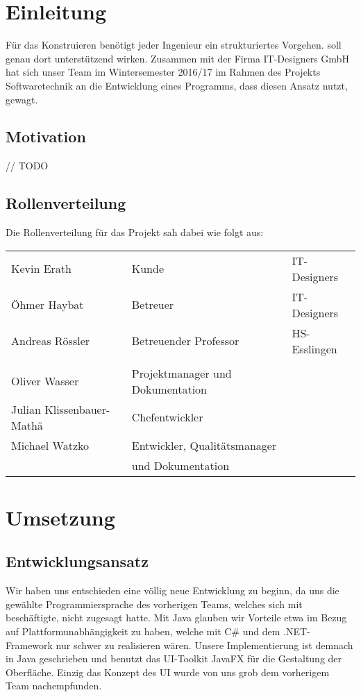 
\section{Einleitung}

Für das Konstruieren benötigt jeder Ingenieur ein strukturiertes Vorgehen. \textFlowDesign{}
soll genau dort unterstützend wirken.
Zusammen mit der Firma IT-Designers GmbH hat sich unser Team im Wintersemester 2016/17 im
Rahmen des Projekts Softwaretechnik an die Entwicklung eines Programms, dass diesen Ansatz
nutzt, gewagt.

\subsection{Motivation}
// TODO

\subsection{Rollenverteilung}
Die Rollenverteilung für das Projekt sah dabei wie folgt aus:

\begin{center}
	\begin{tabular}{l|l l}
		Kevin Erath & Kunde     & IT-Designers \\
		Öhmer Haybat & Betreuer & IT-Designers \\
		Andreas Rössler & Betreuender Professor & HS-Esslingen \\
		\\
		Oliver Wasser             & Projektmanager und Dokumentation & \\
		Julian Klissenbauer-Mathä & Chefentwickler & \\
		Michael Watzko            & Entwickler, Qualitätsmanager  \\
		                          & und Dokumentation \\
	\end{tabular}
\end{center}

\pagebreak
\section{Umsetzung}

\subsection{Entwicklungsansatz}
Wir haben uns entschieden eine völlig neue Entwicklung zu beginn, da uns die gewählte
Programmiersprache des vorherigen Teams, welches sich mit \textFlowDesign{} beschäftigte,
nicht zugesagt hatte. Mit Java glauben wir Vorteile etwa im Bezug auf 
Plattformunabhängigkeit zu haben, welche mit C\# und dem .NET-Framework nur schwer zu
realisieren wären. \newline
Unsere Implementierung ist demnach in Java geschrieben und benutzt das UI-Toolkit JavaFX
für die Gestaltung der Oberfläche. \newline
Einzig das Konzept des UI wurde von uns grob dem vorherigem Team nachempfunden.


